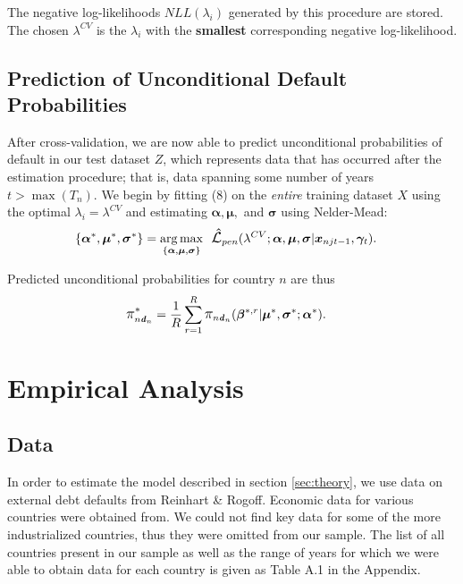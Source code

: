 \documentclass[12pt]{article}
\begin{document}
The negative log-likelihoods $NLL(\lambda_i)$ generated by this procedure are stored. The chosen $\lambda^{CV}$ is the $\lambda_{i}$ with the \textbf{smallest} corresponding negative log-likelihood.

\subsection{Prediction of Unconditional Default Probabilities}

After cross-validation, we are now able to predict unconditional probabilities of default in our test dataset $Z$, which represents data that has occurred after the estimation procedure; that is, data spanning some number of years $t > \max(T_n)$. We begin by fitting (8) on the \textit{entire} training dataset $X$ using the optimal $\lambda_i = \lambda^{CV}$ and estimating $\boldsymbol{\alpha}, \boldsymbol{\mu},$ and $\boldsymbol{\sigma}$ using Nelder-Mead:
\begin{align*}
\{\boldsymbol{\alpha}^*, \boldsymbol{\mu}^*, \boldsymbol{\sigma}^*\} &= \underset{\{\boldsymbol{\alpha}, \boldsymbol{\mu}, \boldsymbol{\sigma}\}}{\arg \max} \ \ \mathlarger{\hat{\mathcal{L}}}_{pen}(\lambda^{CV}; \boldsymbol{\alpha}, \boldsymbol{\mu}, \boldsymbol{\sigma}|\boldsymbol{x}_{njt-1}, \boldsymbol{\gamma}_t).
\end{align*}

Predicted unconditional probabilities for country $n$ are thus
\begin{align}
\mathlarger{\pi^{*}}_{n\boldsymbol{\mathit{d}}_n} &= 
\frac{1}{R} \sum\limits_{r=1}^{R} \mathlarger{\pi}_{n\boldsymbol{\mathit{d}}_n}(\boldsymbol{\beta}^{*,r}|\boldsymbol{\mu}^{*}, \boldsymbol{\sigma}^{*}; \boldsymbol{\alpha}^{*}).
\end{align}

\section{Empirical Analysis} \label{sec:empirics}

\subsection{Data}

In order to estimate the model described in section \ref{sec:theory}, we use data on external debt defaults from Reinhart \& Rogoff. Economic data for various countries were obtained from. We could not find key data for some of the more industrialized countries, thus they were omitted from our sample. The list of all countries present in our sample as well as the range of years for which we were able to obtain data for each country is given as Table A.1 in the Appendix.
\end{document}
